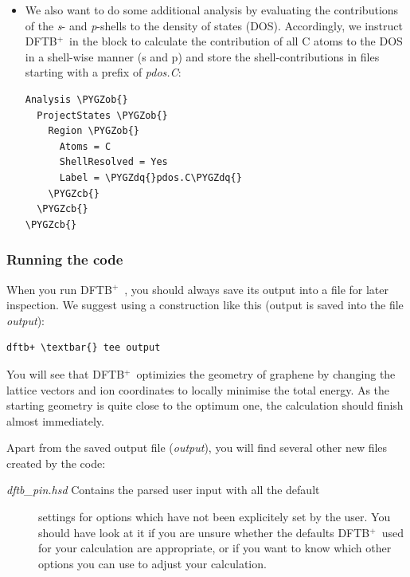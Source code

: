 \documentclass[a4paper,11pt,english]{sphinxmanual}
\newcommand{\dftbp}{\textsf{DFTB$^{\text{+}}$\ }} %
\def\PYGZob{\char`\{}
\def\PYGZcb{\char`\}}
\def\PYGZdq{\char`\"}
\begin{document}
{{\begin{itemize}
\begin{Verbatim}[commandchars=\\\{\}]
KPointsAndWeights = SuperCellFolding \PYGZob{}
  48 0 0
  0 48 0
  0 0 1
  0.5 0.5 0.0
\PYGZcb{}
\end{Verbatim}

\item {} 
We also want to do some additional analysis by evaluating the
contributions of the \emph{s}- and \emph{p}-shells to the density of states
(DOS). Accordingly, we instruct \dftbp in the  block to
calculate the contribution of all C atoms to the DOS in a shell-wise
manner (s and p) and store the shell-contributions in files starting
with a prefix of \emph{pdos.C}:

\begin{Verbatim}[commandchars=\\\{\}]
Analysis \PYGZob{}
  ProjectStates \PYGZob{}
    Region \PYGZob{}
      Atoms = C
      ShellResolved = Yes
      Label = \PYGZdq{}pdos.C\PYGZdq{}
    \PYGZcb{}
  \PYGZcb{}
\PYGZcb{}
\end{Verbatim}

\end{itemize}


\subsubsection{Running the code}
\label{electstruct:running-the-code}
When you run \dftbp, you should always save its output into a file for
later inspection. We suggest using a construction like this (output is
saved into the file \emph{output}):

\begin{Verbatim}[commandchars=\\\{\}]
dftb+ \textbar{} tee output
\end{Verbatim}

You will see that \dftbp optimizies the geometry of graphene by
changing the lattice vectors and ion coordinates to locally minimise
the total energy. As the starting geometry is quite close to the
optimum one, the calculation should finish almost immediately.

Apart from the saved output file (\emph{output}), you will find several
other new files created by the code:
\begin{description}
\item[{\emph{dftb\_pin.hsd} Contains the parsed user input with all the default}] \leavevmode
settings for options which have not been explicitely set by the
user. You should have look at it if you are unsure whether the
defaults \dftbp used for your calculation are appropriate, or if you
want to know which other options you can use to adjust your
calculation.


\end{description}}}
\end{document}
